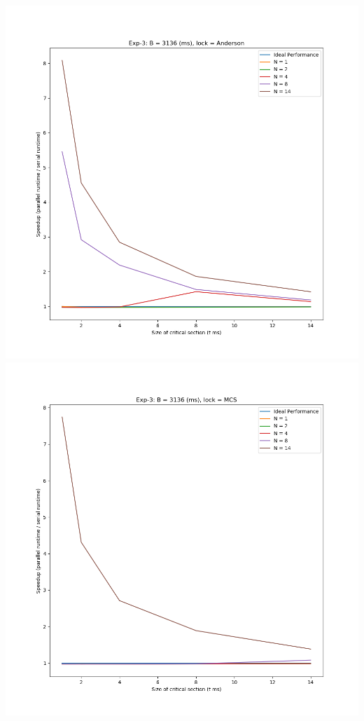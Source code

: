 \documentclass[]{article}
\begin{document}
\includegraphics[scale=0.5]{graphs/exp3_a.png}\\
\includegraphics[scale=0.5]{graphs/exp3_m.png}\\
\end{document}
